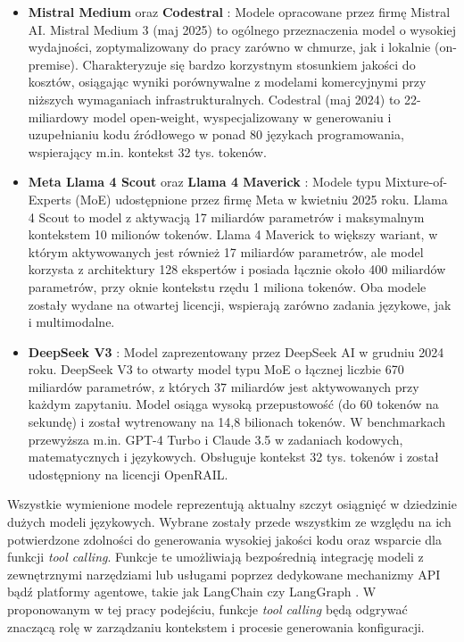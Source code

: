 \begin{itemize}
    \item \textbf{Mistral Medium} \cite{mistral_medium_3} oraz \textbf{Codestral} \cite{codestral}: Modele opracowane przez firmę Mistral AI. Mistral Medium 3 (maj 2025) to ogólnego przeznaczenia model o wysokiej wydajności, zoptymalizowany do pracy zarówno w chmurze, jak i lokalnie (on-premise). Charakteryzuje się bardzo korzystnym stosunkiem jakości do kosztów, osiągając wyniki porównywalne z modelami komercyjnymi przy niższych wymaganiach infrastrukturalnych. Codestral (maj 2024) to 22-miliardowy model open-weight, wyspecjalizowany w generowaniu i uzupełnianiu kodu źródłowego w ponad 80 językach programowania, wspierający m.in. kontekst 32 tys. tokenów.

    \item \textbf{Meta Llama 4 Scout} oraz \textbf{Llama 4 Maverick} \cite{llama4}: Modele typu Mixture-of-Experts (MoE) \cite{masoudnia_mixture_2014} udostępnione przez firmę Meta w kwietniu 2025 roku. Llama 4 Scout to model z aktywacją 17 miliardów parametrów i maksymalnym kontekstem 10 milionów tokenów. Llama 4 Maverick to większy wariant, w którym aktywowanych jest również 17 miliardów parametrów, ale model korzysta z architektury 128 ekspertów i posiada łącznie około 400 miliardów parametrów, przy oknie kontekstu rzędu 1 miliona tokenów. Oba modele zostały wydane na otwartej licencji, wspierają zarówno zadania językowe, jak i multimodalne.

    \item \textbf{DeepSeek V3} \cite{deepseek_v3}: Model zaprezentowany przez DeepSeek AI w grudniu 2024 roku. DeepSeek V3 to otwarty model typu MoE o łącznej liczbie 670 miliardów parametrów, z których 37 miliardów jest aktywowanych przy każdym zapytaniu. Model osiąga wysoką przepustowość (do 60 tokenów na sekundę) i został wytrenowany na 14,8 bilionach tokenów. W benchmarkach przewyższa m.in. GPT-4 Turbo i Claude 3.5 w zadaniach kodowych, matematycznych i językowych. Obsługuje kontekst 32 tys. tokenów i został udostępniony na licencji OpenRAIL.
\end{itemize}

Wszystkie wymienione modele reprezentują aktualny szczyt osiągnięć w dziedzinie dużych modeli językowych. Wybrane zostały przede wszystkim ze względu na ich potwierdzone zdolności do generowania wysokiej jakości kodu oraz wsparcie dla funkcji \textit{tool calling}. Funkcje te umożliwiają bezpośrednią integrację modeli z zewnętrznymi narzędziami lub usługami poprzez dedykowane mechanizmy API bądź platformy agentowe, takie jak LangChain \cite{langchain} czy LangGraph \cite{langgraph}. W proponowanym w tej pracy podejściu, funkcje \textit{tool calling} będą odgrywać znaczącą rolę w zarządzaniu kontekstem i procesie generowania konfiguracji.

